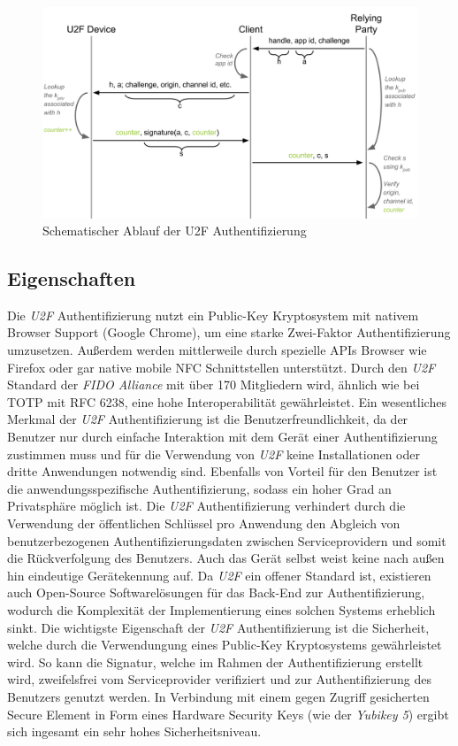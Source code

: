 \documentclass[11pt,a4paper,ngerman]{scrreprt}
\begin{document}
\begin{figure}[htbp]
    \centering
        \includegraphics[width=\textwidth]{Abbildungen/yubico_u2f_flow}
    \caption{Schematischer Ablauf der U2F Authentifizierung \cite{u2fTech}}
    \label{fig:U2F-Auth}
\end{figure}
\subsection{Eigenschaften}
Die \textit{U2F} Authentifizierung nutzt ein Public-Key Kryptosystem mit nativem Browser Support (Google Chrome), um eine starke Zwei-Faktor Authentifizierung umzusetzen. Außerdem werden mittlerweile durch spezielle APIs Browser wie Firefox oder gar native mobile NFC Schnittstellen unterstützt. Durch den \textit{U2F} Standard der \textit{FIDO Alliance} mit über 170 Mitgliedern wird, ähnlich wie bei TOTP mit RFC 6238, eine hohe Interoperabilität gewährleistet. Ein wesentliches Merkmal der \textit{U2F} Authentifizierung ist die Benutzerfreundlichkeit, da der Benutzer nur durch einfache Interaktion mit dem Gerät einer Authentifizierung zustimmen muss und für die Verwendung von \textit{U2F} keine Installationen oder dritte Anwendungen notwendig sind. Ebenfalls von Vorteil für den Benutzer ist die anwendungsspezifische Authentifizierung, sodass ein hoher Grad an Privatsphäre möglich ist. Die \textit{U2F} Authentifizierung verhindert durch die Verwendung der öffentlichen Schlüssel pro Anwendung den Abgleich von benutzerbezogenen Authentifizierungsdaten zwischen Serviceprovidern und somit die Rückverfolgung des Benutzers. Auch das Gerät selbst weist keine nach außen hin eindeutige Gerätekennung auf. Da \textit{U2F} ein offener Standard ist, existieren auch Open-Source Softwarelösungen für das Back-End zur Authentifizierung, wodurch die Komplexität der Implementierung eines solchen Systems erheblich sinkt. Die wichtigste Eigenschaft der \textit{U2F} Authentifizierung ist die Sicherheit, welche durch die Verwendungung eines Public-Key Kryptosystems gewährleistet wird. So kann die Signatur, welche im Rahmen der Authentifizierung erstellt wird, zweifelsfrei vom Serviceprovider verifiziert und zur Authentifizierung des Benutzers genutzt werden. In Verbindung mit einem gegen Zugriff gesicherten Secure Element in Form eines Hardware Security Keys (wie der \textit{Yubikey 5}) ergibt sich ingesamt ein sehr hohes Sicherheitsniveau.
\end{document}
